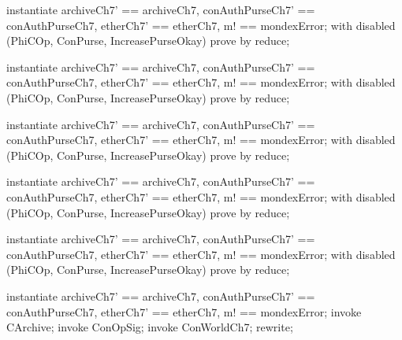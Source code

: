 \begin{LPScript}\begin{zproof}[tCValIsTotal]
    instantiate archiveCh7' == archiveCh7,
        conAuthPurseCh7' == conAuthPurseCh7,
        etherCh7' == etherCh7, m! == mondexError;
    with disabled (PhiCOp, ConPurse, IncreasePurseOkay) prove by reduce;
\end{zproof}\end{LPScript}

\begin{LPScript}\begin{zproof}[tCAckIsTotal]
    instantiate archiveCh7' == archiveCh7,
        conAuthPurseCh7' == conAuthPurseCh7,
        etherCh7' == etherCh7, m! == mondexError;
    with disabled (PhiCOp, ConPurse, IncreasePurseOkay) prove by reduce;
\end{zproof}\end{LPScript}

\begin{LPScript}\begin{zproof}[tCReadExceptionLogIsTotal]
    instantiate archiveCh7' == archiveCh7,
        conAuthPurseCh7' == conAuthPurseCh7,
        etherCh7' == etherCh7, m! == mondexError;
    with disabled (PhiCOp, ConPurse, IncreasePurseOkay) prove by reduce;
\end{zproof}\end{LPScript}

\begin{LPScript}\begin{zproof}[tCClearExceptionLogIsTotal]
    instantiate archiveCh7' == archiveCh7,
        conAuthPurseCh7' == conAuthPurseCh7,
        etherCh7' == etherCh7, m! == mondexError;
    with disabled (PhiCOp, ConPurse, IncreasePurseOkay) prove by reduce;
\end{zproof}\end{LPScript}

\begin{LPScript}\begin{zproof}[tCAuthoriseExLogClearIsTotal]
    instantiate archiveCh7' == archiveCh7,
        conAuthPurseCh7' == conAuthPurseCh7,
        etherCh7' == etherCh7, m! == mondexError;
    with disabled (PhiCOp, ConPurse, IncreasePurseOkay) prove by reduce;
\end{zproof}\end{LPScript}

\begin{LPScript}\begin{zproof}[tCArchiveIsTotal]
    instantiate archiveCh7' == archiveCh7,
        conAuthPurseCh7' == conAuthPurseCh7,
        etherCh7' == etherCh7, m! == mondexError;
    invoke CArchive;
    invoke ConOpSig;
    invoke \Delta ConWorldCh7;
    rewrite;
\end{zproof}\end{LPScript}

